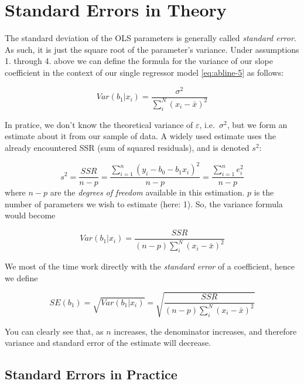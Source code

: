 \documentclass[]{book}
\begin{document}
\hypertarget{se-theory}{%
\section{Standard Errors in Theory}\label{se-theory}}

The standard deviation of the OLS parameters is generally called \emph{standard error}. As such, it is just the square root of the parameter's variance.
Under assumptions 1. through 4. above we can define the formula for the variance of our slope coefficient in the context of our single regressor model \eqref{eq:abline-5} as follows:

\begin{equation}
Var(b_1|x_i) = \frac{\sigma^2}{\sum_i^N (x_i - \bar{x})^2}  \label{eq:var-ols}
\end{equation}

In pratice, we don't know the theoretical variance of \(\varepsilon\), i.e.~\(\sigma^2\), but we form an estimate about it from our sample of data. A widely used estimate uses the already encountered SSR (sum of squared residuals), and is denoted \(s^2\):

\[
s^2 = \frac{SSR}{n-p} = \frac{\sum_{i=1}^n (y_i - b_0 - b_1 x_i)^2}{n-p} =  \frac{\sum_{i=1}^n e_i^2}{n-p}
\]
where \(n-p\) are the \emph{degrees of freedom} available in this estimation. \(p\) is the number of parameters we wish to estimate (here: 1). So, the variance formula would become

\begin{equation}
Var(b_1|x_i) = \frac{SSR}{(n-p)\sum_i^N (x_i - \bar{x})^2}  \label{eq:var-ols2}
\end{equation}

We most of the time work directly with the \emph{standard error} of a coefficient, hence we define

\begin{equation}
SE(b_1) = \sqrt{Var(b_1|x_i)} = \sqrt{\frac{SSR}{(n-p)\sum_i^N (x_i - \bar{x})^2}}  \label{eq:SE-ols2}
\end{equation}

You can clearly see that, as \(n\) increases, the denominator increases, and therefore variance and standard error of the estimate will decrease.

\hypertarget{standard-errors-in-practice}{%
\subsection{Standard Errors in Practice}\label{standard-errors-in-practice}}
\end{document}
